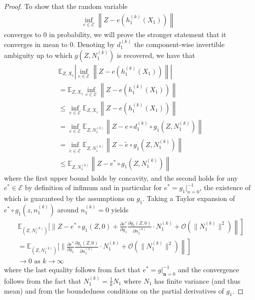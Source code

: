 \begin{proof}
To show that the random variable 
\begin{align*}
\inf_{{e}\in \mathcal{E}}  \left \|Z - {e}(h_1^{(k)}(X_1)) \right \|
\end{align*}
converges to $0$ in probability, we will prove the stronger statement that it converges in mean to $0$.
Denoting by ${d}^{(k)}_1$ the component-wise invertible ambiguity up to which ${g}(Z, N_1^{(k)})$ is recovered, we have that
	\begin{align}
	&\mathbb{E}_{Z, X_1} \left| \inf_{{e}\in \mathcal{E}}  \left \|Z - {e}(h_1^{(k)}(X_1)) \right \| \right| \\
	& = \mathbb{E}_{Z, X_1} \inf_{{e}\in \mathcal{E}}  \left \|Z - {e}(h_1^{(k)}(X_1)) \right \| \\
	& \leq \inf_{{e}\in \mathcal{E}} \mathbb{E}_{Z, X_1} \left \|Z - {e}(h_1^{(k)}(X_1)) \right \| \\
	& = \inf_{{e}\in \mathcal{E}} \mathbb{E}_{Z, N_1^{(k)}} \left \|Z - {e} \circ d_1^{(k)} \circ g_1(Z, N_1^{(k)}) \right \| \\
	& = \inf_{\tilde{e}\in \mathcal{E}} \mathbb{E}_{Z, N_1^{(k)}} \left \|Z - \tilde{e} \circ g_1(Z, N_1^{(k)}) \right \| \\
	& \leq \mathbb{E}_{Z, N_1^{(k)}} \left \|Z - e^* \circ g_1(Z, N_1^{(k)}) \right \| \label{eq:low_bounded} 
	\end{align}
	where the first upper bound holds by concavity, and the second holds for any ${e^*}\in\mathcal{E}$ by definition of infimum and in particular for ${e^*} = {g}_1 |^{-1}_{{n}=0}$, the existence of which is guaranteed by the assumptions on ${g}_1$.
	Taking a Taylor expansion of ${e^*} \circ  {g}_1(z, {n}_1^{(k)})$ around ${n}_1^{(k)}=0$ yields
	\begin{align*}
	&\mathbb{E}_{(Z, N_1^{(k)})} \Bigg[  \Bigg\|Z - e^* \circ {g}_1 (Z, 0) 
	+ \left.\left.\frac{\partial e^*}{\partial {g}_1} \frac{\partial {g}_1 (Z, 0)}{\partial {n}_1^{(k)}} \cdot N_1^{(k)} + \mathcal{O}(\|N_1^{(k)}\|^2) \right \| \right]\\
	&=\mathbb{E}_{(Z, N_1^{(k)})} \Bigg[  \Bigg\|\left.\left.\frac{\partial e^*}{\partial {g}_1} \frac{\partial {g}_1 (Z, 0)}{\partial {n}_1^{(k)}} \cdot N_1^{(k)} + \mathcal{O}(\|N_1^{(k)}\|^2) \right \| \right]\\
	&\longrightarrow 0 \text{ as $k \longrightarrow \infty$}
	\end{align*}
	where the last equality follows from fact that $e^* = g |^{-1}_{\bm{n}=0}$ and the convergence follows from the fact that $N_1^{(k)} = \frac{1}{k} N_1$ where $N_1$ has finite variance (and thus mean) and from the boundedness conditions on the partial derivatives of $g_1$.
\end{proof}


